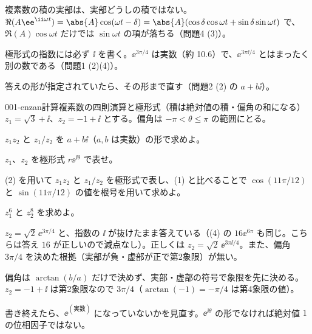 \documentclass[uplatex,dvipdfmx,a4paper,11pt]{jsarticle}
\begin{document}
\matome
\begin{saitenichiran}
\end{saitenichiran}
\begin{daiji}
  \item 複素数の積の実部は、実部どうしの積ではない。$\Re(A\ee^{\ii\omega t})=\abs{A}\cos(\omega t-\delta)=\abs{A}(\cos\delta\cos\omega t+\sin\delta\sin\omega t)$ で、$\Re(A)\cos\omega t$ だけでは $\sin\omega t$ の項が落ちる（問題4 (3)）。
  \item 極形式の指数には必ず $\ii$ を書く。$\ee^{3\pi/4}$ は実数（約 \num{10.6}）で、$\ee^{3\pi\ii/4}$ とはまったく別の数である（問題1 (2)(4)）。
  \item 答えの形が指定されていたら、その形まで直す（問題2 (2) の $a+b\ii$）。
\end{daiji}

\mondaihen
{}
\begin{mondai}{001-enzan}{計算}{複素数の四則演算と極形式（積は絶対値の積・偏角の和になる）}
$z_{1}=\sqrt{3}+\ii$、$z_{2}=-1+\ii$ とする。偏角は $-\pi<\theta\le\pi$ の範囲にとる。
  \begin{shoumon}
    \item $z_{1}z_{2}$ と $z_{1}/z_{2}$ を $a+b\ii$（$a,b$ は実数）の形で求めよ。
    \item $z_{1}$、$z_{2}$ を極形式 $r\ee^{\ii\theta}$ で表せ。
    \item (2) を用いて $z_{1}z_{2}$ と $z_{1}/z_{2}$ を極形式で表し、(1) と比べることで $\cos(11\pi/12)$ と $\sin(11\pi/12)$ の値を根号を用いて求めよ。
    \item $z_{1}^{6}$ と $z_{2}^{8}$ を求めよ。
  \end{shoumon}

\begin{kotaeran}
   $z_{2}=\sqrt{2}\,\ee^{3\pi/4}$ と、指数の $\ii$ が抜けたまま答えている（(4) の $16\ee^{6\pi}$ も同じ。こちらは答え $16$ が正しいので減点なし）。正しくは $z_{2}=\sqrt{2}\,\ee^{3\pi\ii/4}$。また、偏角 $3\pi/4$ を決めた根拠（実部が負・虚部が正で第2象限）が無い。
\end{kotaeran}
\begin{rikai}
  \item 偏角は $\arctan(b/a)$ だけで決めず、実部・虚部の符号で象限を先に決める。$z_{2}=-1+\ii$ は第2象限なので $3\pi/4$（$\arctan(-1)=-\pi/4$ は第4象限の値）。
  \item 書き終えたら、$\ee^{(\text{実数})}$ になっていないかを見直す。$\ee^{\ii\theta}$ の形でなければ絶対値 $1$ の位相因子ではない。
\end{rikai}
\end{mondai}
\end{document}
